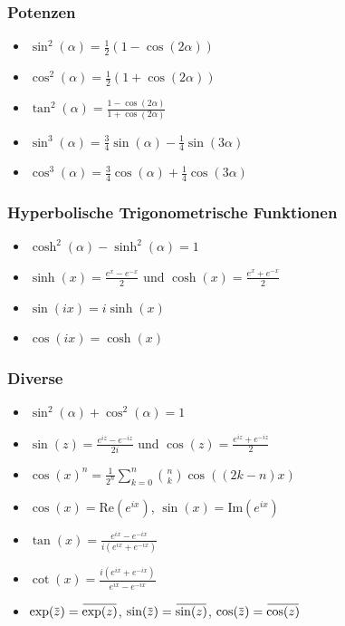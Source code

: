 \documentclass[a4paper,10pt]{article}
\def\Re{\text{Re}}
\def\Im{\text{Im}}
\newcommand{\overbar}[1]{\mkern 1.5mu\overline{\mkern-1.5mu#1\mkern-1.5mu}\mkern 1.5mu}
\begin{document}
\subsubsection{Potenzen}
\begin{itemize}
 \item $\sin^2(\alpha) = \frac{1}{2}(1-\cos(2\alpha))$
 \item $\cos^2(\alpha) = \frac{1}{2}(1+\cos(2\alpha))$
 \item $\tan^2(\alpha) = \frac{1-\cos(2\alpha)}{1+\cos(2\alpha)}$
 \item $\sin^3(\alpha) = \frac{3}{4} \sin(\alpha) - \frac{1}{4} \sin(3 \alpha)$
 \item $\cos^3(\alpha) = \frac{3}{4} \cos(\alpha) + \frac{1}{4} \cos(3 \alpha)$
\end{itemize}

\subsubsection{Hyperbolische Trigonometrische Funktionen}
\begin{itemize}
  \item $\cosh^2(\alpha) - \sinh^2(\alpha) = 1$
  \item $\sinh(x) = \frac{e^x - e^{-x}}{2}$ und $\cosh(x) = \frac{e^x + e^{-x}}{2}$
  \item $\sin(ix) = i \sinh(x)$
  \item $\cos(ix) = \cosh(x)$
 \end{itemize}

\subsubsection{Diverse}

\begin{itemize}
 \item $\sin^2(\alpha) + \cos^2(\alpha) = 1$
 \item $\sin(z) = \frac{e^{iz} - e^{-iz}}{2i}$ und $\cos(z) = \frac{e^{iz} + e^{-iz}}{2}$
 \item $\cos(x)^n = \frac{1}{2^n} \sum_{k=0}^n {n \choose k} \cos((2k - n)x)$
 \item $\cos(x) = \Re(e^{ix})$, $\sin(x) = \Im(e^{ix})$
 \item $\tan(x) = \frac{e^{ix} - e^{-ix}}{i(e^{ix} + e^{-ix})}$
 \item $\cot(x) = \frac{i(e^{ix} + e^{-ix})}{e^{ix} - e^{-ix}}$
 \item $\exp(\overbar{z}) = \overbar{\exp(z)}$, $\sin(\overbar{z}) = \overbar{\sin(z)}$, $\cos(\overbar{z}) = \overbar{\cos(z)}$
\end{itemize}
\end{document}
